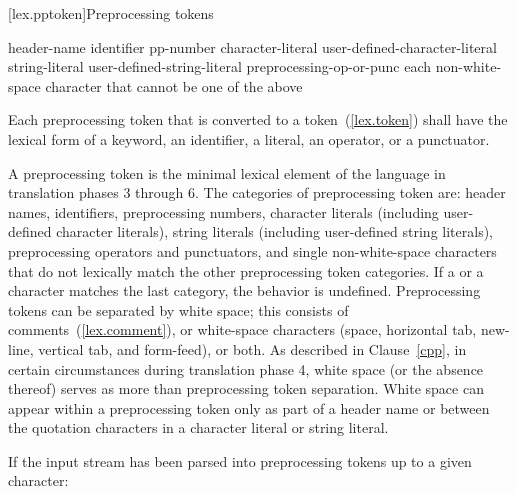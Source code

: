 [lex.pptoken]{Preprocessing tokens}

\begin{bnf}
%
\br
    header-name\br
    identifier\br
    pp-number\br
    character-literal\br
    user-defined-character-literal\br
    string-literal\br
    user-defined-string-literal\br
    preprocessing-op-or-punc\br
    \textnormal{each non-white-space character that cannot be one of the above}
\end{bnf}

\pnum
Each preprocessing token that is converted to a token~(\ref{lex.token})
shall have the lexical form of a keyword, an identifier, a literal, an
operator, or a punctuator.

\pnum
A preprocessing token is the minimal lexical element of the language in translation
phases 3 through 6. The categories of preprocessing token are: header names,
identifiers, preprocessing numbers, character literals (including user-defined character
literals), string literals (including user-defined string literals), preprocessing
operators and punctuators, and single non-white-space characters that do not lexically
match the other preprocessing token categories. If a  or a  character
matches the last category, the behavior is undefined. Preprocessing tokens can be
separated by
%
white space;
%
this consists of comments~(\ref{lex.comment}), or white-space
characters (space, horizontal tab, new-line, vertical tab, and
form-feed), or both. As described in Clause~\ref{cpp}, in certain
circumstances during translation phase 4, white space (or the absence
thereof) serves as more than preprocessing token separation. White space
can appear within a preprocessing token only as part of a header name or
between the quotation characters in a character literal or string
literal.

\pnum
If the input stream has been parsed into preprocessing tokens up to a
given character:

